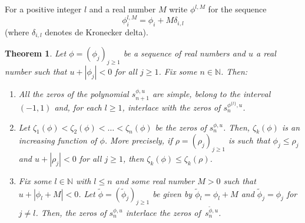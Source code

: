 \documentclass[10pt, a4paper, leqno]{amsart}
\numberwithin{equation}{section}
\theoremstyle{plain}
\newtheorem{Theo}{Theorem}[section]
\theoremstyle{remark}
\newcommand{\NN}{\mathbb{N}}
\newcommand{\spu}{s^{\phi,u}}
\begin{document}
For a positive integer $l$ and a real number $M$ write $\phi^{l,M}$ for the sequence
\begin{equation}
\label{sph}
  \phi^{l,M}_i = \phi_i+M\delta_{i,l}
\end{equation}
(where $\delta_{i,l}$ denotes de Kronecker delta).

\begin{Theo}
Let $\phi = (\phi_j)_{j\ge 1}$ be a sequence of real numbers and $u$ a real number such that $u + |\phi_j| < 0$ for all $j \ge 1$. Fix some $n \in \NN$. Then:
\begin{enumerate}
\item All the zeros of the polynomial $\spu_{n+1}$ are simple, belong to the interval $(-1,1)$ and, for each $l \ge 1$, interlace with the zeros of $s_n^{\phi^{\{l\}},u}$.

\item Let $\zeta_1(\phi) < \zeta_2(\phi) < \dots < \zeta_n(\phi)$ be the zeros of $\spu_n$. Then, $\zeta_k(\phi)$ is an increasing function of $\phi$. More precisely, if $\rho = (\rho_j)_{j\ge 1}$ is such that $\phi_j \le \rho_j$ and $u + |\rho_j| < 0$ for all $j \ge 1$, then $\zeta_k(\phi) \le \zeta_k(\rho)$.

\item Fix some $l \in \NN$ with $l \le n$ and some real number $M > 0$ such that $u + |\phi_l + M| < 0$. Let $\tilde{\phi} = (\tilde{\phi}_j)_{j \ge 1}$ be given by $\tilde{\phi}_l = \phi_l + M$ and $\tilde{\phi}_j = \phi_j$ for $j \ne l$. Then, the zeros of $\spu_n$ interlace the zeros of~$s_n^{\tilde{\phi},u}$.
\end{enumerate}
\end{Theo}
\end{document}
